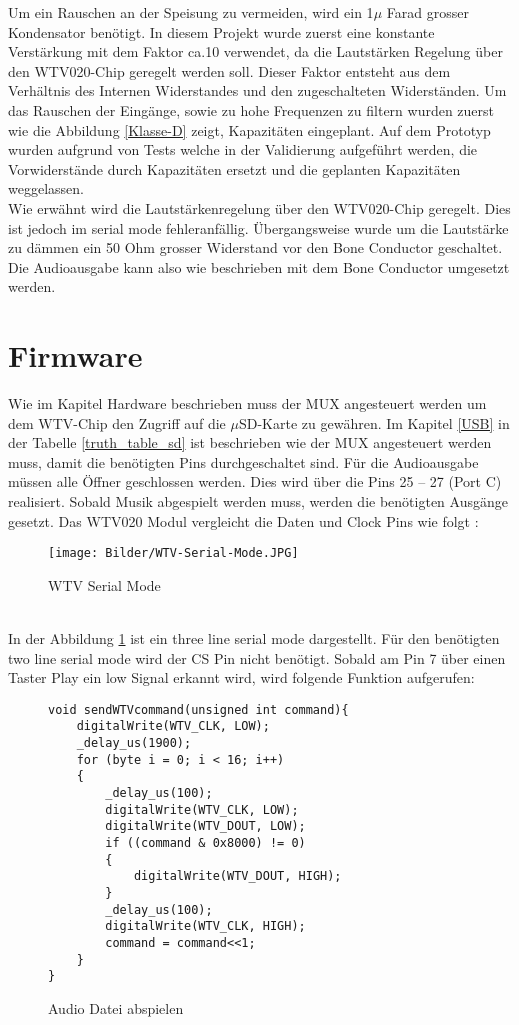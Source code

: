 Um ein Rauschen an der Speisung zu vermeiden, wird ein 1$\mu$ Farad grosser Kondensator benötigt. In diesem Projekt wurde zuerst eine konstante Verstärkung mit dem Faktor ca.10 verwendet, da die Lautstärken Regelung über den WTV020-Chip geregelt werden soll. Dieser Faktor entsteht aus dem Verhältnis des Internen Widerstandes und den zugeschalteten Widerständen. Um das Rauschen der Eingänge, sowie zu hohe Frequenzen zu filtern wurden zuerst wie die Abbildung \ref{Klasse-D} zeigt, Kapazitäten eingeplant. Auf dem Prototyp wurden aufgrund von Tests welche in der Validierung aufgeführt werden, die Vorwiderstände durch Kapazitäten ersetzt und die geplanten Kapazitäten weggelassen.\\ Wie erwähnt wird die Lautstärkenregelung über den WTV020-Chip geregelt. Dies ist jedoch im serial mode fehleranfällig. Übergangsweise wurde um die Lautstärke zu dämmen ein 50 Ohm grosser Widerstand vor den Bone Conductor geschaltet. Die Audioausgabe kann also wie beschrieben mit dem Bone Conductor umgesetzt werden.

\section{Firmware}
Wie im Kapitel Hardware beschrieben muss der MUX angesteuert werden um dem WTV-Chip den Zugriff auf die $\mu$SD-Karte zu gewähren. Im Kapitel \ref{USB} in der Tabelle \ref{truth_table_sd} ist beschrieben wie der MUX angesteuert werden muss, damit die benötigten Pins durchgeschaltet sind.
Für die Audioausgabe müssen alle Öffner geschlossen werden. Dies wird über die Pins 25 – 27 (Port C) realisiert. Sobald Musik abgespielt werden muss, werden die benötigten Ausgänge gesetzt. Das  WTV020 Modul vergleicht die Daten und Clock Pins wie folgt :
\begin{figure}[h]
	\centering
	\texttt{[image: Bilder/WTV-Serial-Mode.JPG]}
	\caption{WTV Serial Mode}
	\label{WTV-Serial}
\end{figure}\\
In der Abbildung \ref{WTV-Serial} ist ein three line serial mode dargestellt. Für den benötigten two line serial mode wird der CS Pin nicht benötigt.
\newpage
Sobald am Pin 7 über einen Taster Play ein low Signal erkannt wird, wird folgende Funktion aufgerufen:

\begin{figure}[h]
	\begin{verbatim}
void sendWTVcommand(unsigned int command){
	digitalWrite(WTV_CLK, LOW);
	_delay_us(1900);
	for (byte i = 0; i < 16; i++)
	{
		_delay_us(100);
		digitalWrite(WTV_CLK, LOW);
		digitalWrite(WTV_DOUT, LOW);
		if ((command & 0x8000) != 0)
		{
			digitalWrite(WTV_DOUT, HIGH);
		}
		_delay_us(100);
		digitalWrite(WTV_CLK, HIGH);
		command = command<<1;
	}
}
	\end{verbatim}
	\caption{Audio Datei abspielen \cite{WTVCODE}}
	\label{WTV-Play}
\end{figure}


